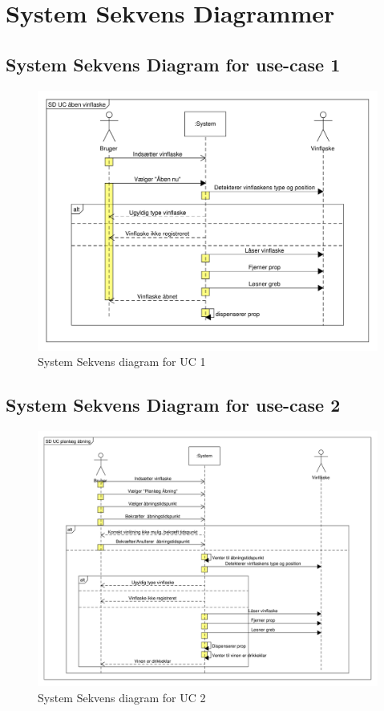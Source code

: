 \section{System Sekvens Diagrammer}

\subsection{System Sekvens Diagram for use-case 1}

\begin{figure}[H]
	\centering
	\includegraphics[scale=0.45]{SD/SSDUC1}
	\caption{System Sekvens diagram for UC 1}
	\label{SSDUC1}
\end{figure}

\subsection{System Sekvens Diagram for use-case 2}

\begin{figure}[H]
	\centering
	\includegraphics[scale=0.35]{SD/SSDUC2}
	\caption{System Sekvens diagram for UC 2}
	\label{SSDUC2}
\end{figure}